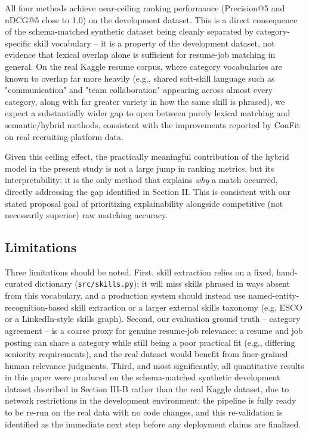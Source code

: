 \documentclass[conference]{IEEEtran}
\begin{document}
All four methods achieve near-ceiling ranking performance (Precision@5 and nDCG@5 close to 1.0) on the development dataset. This is a direct consequence of the schema-matched synthetic dataset being cleanly separated by category-specific skill vocabulary -- it is a property of the development dataset, not evidence that lexical overlap alone is sufficient for resume-job matching in general. On the real Kaggle resume corpus, where category vocabularies are known to overlap far more heavily (e.g., shared soft-skill language such as "communication" and "team collaboration" appearing across almost every category, along with far greater variety in how the same skill is phrased), we expect a substantially wider gap to open between purely lexical matching and semantic/hybrid methods, consistent with the improvements reported by ConFit \cite{yu2024confit} on real recruiting-platform data.

Given this ceiling effect, the practically meaningful contribution of the hybrid model in the present study is not a large jump in ranking metrics, but its interpretability: it is the only method that explains \emph{why} a match occurred, directly addressing the gap identified in Section II. This is consistent with our stated proposal goal of prioritizing explainability alongside competitive (not necessarily superior) raw matching accuracy.

\subsection{Limitations}

Three limitations should be noted. First, skill extraction relies on a fixed, hand-curated dictionary (\texttt{src/skills.py}); it will miss skills phrased in ways absent from this vocabulary, and a production system should instead use named-entity-recognition-based skill extraction or a larger external skills taxonomy (e.g. ESCO or a LinkedIn-style skills graph). Second, our evaluation ground truth -- category agreement -- is a coarse proxy for genuine resume-job relevance; a resume and job posting can share a category while still being a poor practical fit (e.g., differing seniority requirements), and the real dataset would benefit from finer-grained human relevance judgments. Third, and most significantly, all quantitative results in this paper were produced on the schema-matched synthetic development dataset described in Section III-B rather than the real Kaggle dataset, due to network restrictions in the development environment; the pipeline is fully ready to be re-run on the real data with no code changes, and this re-validation is identified as the immediate next step before any deployment claims are finalized.
\end{document}
